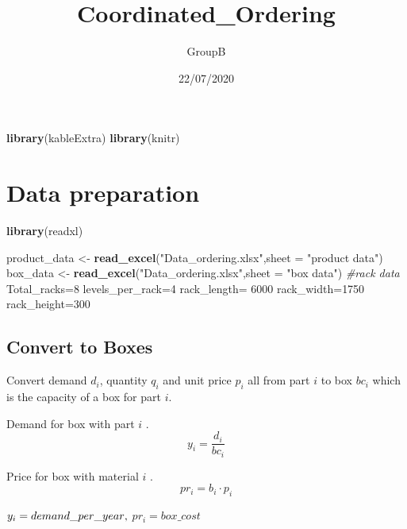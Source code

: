 \documentclass[
]{article}
\title{Coordinated\_Ordering}
\author{GroupB}
\date{22/07/2020}
\newenvironment{Shaded}{\begin{snugshade}}{\end{snugshade}}
\newcommand{\CommentTok}[1]{\textcolor[rgb]{0.56,0.35,0.01}{\textit{#1}}}
\newcommand{\DataTypeTok}[1]{\textcolor[rgb]{0.13,0.29,0.53}{#1}}
\newcommand{\DecValTok}[1]{\textcolor[rgb]{0.00,0.00,0.81}{#1}}
\newcommand{\KeywordTok}[1]{\textcolor[rgb]{0.13,0.29,0.53}{\textbf{#1}}}
\newcommand{\NormalTok}[1]{#1}
\newcommand{\StringTok}[1]{\textcolor[rgb]{0.31,0.60,0.02}{#1}}
\begin{document}
\maketitle

\begin{Shaded}
\begin{Highlighting}[]
\KeywordTok{library}\NormalTok{(kableExtra)}
\KeywordTok{library}\NormalTok{(knitr)}
\end{Highlighting}
\end{Shaded}

\hypertarget{data-preparation}{%
\section{Data preparation}\label{data-preparation}}

\begin{Shaded}
\begin{Highlighting}[]
\KeywordTok{library}\NormalTok{(readxl)}

\NormalTok{product_data <-}\StringTok{ }\KeywordTok{read_excel}\NormalTok{(}\StringTok{"Data_ordering.xlsx"}\NormalTok{,}\DataTypeTok{sheet =} \StringTok{"product data"}\NormalTok{)}
\NormalTok{box_data <-}\StringTok{ }\KeywordTok{read_excel}\NormalTok{(}\StringTok{"Data_ordering.xlsx"}\NormalTok{,}\DataTypeTok{sheet =} \StringTok{"box data"}\NormalTok{)}
\CommentTok{#rack data}
\NormalTok{Total_racks=}\DecValTok{8}
\NormalTok{levels_per_rack=}\DecValTok{4}
\NormalTok{rack_length=}\StringTok{ }\DecValTok{6000}
\NormalTok{rack_width=}\DecValTok{1750}
\NormalTok{rack_height=}\DecValTok{300}
\end{Highlighting}
\end{Shaded}

\hypertarget{convert-to-boxes}{%
\subsection{Convert to Boxes}\label{convert-to-boxes}}

Convert demand \(d_i\), quantity \(q_i\) and unit price \(p_i\) all from
part \(i\) to box \(bc_i\) which is the capacity of a box for part
\(i\).

Demand for box with part \(i\) . \[y_i=\frac {d_i}{bc_i} \]

Price for box with material \(i\) .\[pr_i= b_i \cdot p_i\]

\(y_i = demand\_per\_year \\ ,\) \(pr_i = box\_cost\)
\end{document}
